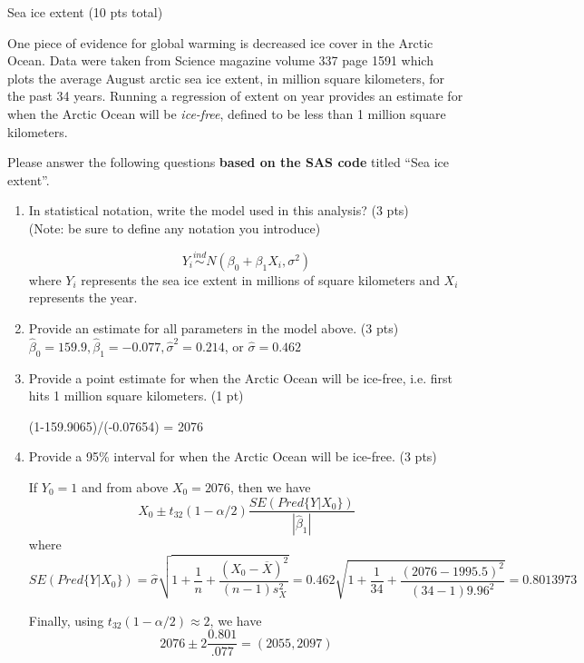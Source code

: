 \documentclass[10pt,draft]{article}
\newcommand{\bigbrk}{\vspace*{2in}}
\newcommand{\smallbrk}{\vspace*{.3in}}
\newcommand{\shortcorrect}[1]{{\color{red} #1}}
\newcommand{\longcorrect}[2][\bigbrk]{{\color{red} #2}}
\newcommand{\shortcorrect}[1]{{\phantom{33.33}}}
\newcommand{\longcorrect}[2][\bigbrk]{#1}
\begin{document}
\newpage
\noindent \begin{Large}Sea ice extent  (10 pts total) \end{Large}

\bigskip

One piece of evidence for global warming is decreased ice cover in the Arctic Ocean. Data were taken from Science magazine volume 337 page 1591 which plots the average August arctic sea ice extent, in million square kilometers, for the past 34 years. Running a regression of extent on year provides an estimate for when the Arctic Ocean will be \emph{ice-free}, defined to be less than 1 million square kilometers.

Please answer the following questions {\bf based on the SAS code} titled ``Sea ice extent''.

\begin{enumerate}
\item In statistical notation, write the model used in this analysis? (3 pts)\\
(Note: be sure to define any notation you introduce)

\longcorrect{\[Y_{i}\stackrel{ind}{\sim} N(\beta_0+\beta_1X_i,\sigma^2)\] where $Y_{i}$ represents the sea ice extent in millions of square kilometers and $X_i$ represents the year.} 

\item Provide an estimate for all parameters in the model above. (3 pts) \\

\longcorrect[\vspace*{.8in}]{$\hat{\beta}_0 = 159.9, \hat{\beta}_1 = -0.077, \hat{\sigma}^2 = 0.214$, or $\hat{\sigma} = 0.462$}

\item Provide a point estimate for when the Arctic Ocean will be ice-free, i.e. first hits 1 million square kilometers. (1 pt)

\shortcorrect{(1-159.9065)/(-0.07654) = 2076}\smallbrk

\item Provide a 95\% interval for when the Arctic Ocean will be ice-free. (3 pts)

\longcorrect{If $Y_0=1$ and from above $X_0=2076$, then we have 
\[ X_0 \pm t_{32}(1-\alpha/2) \frac{SE(Pred\{Y|X_0\})}{|\hat{\beta}_1|} \]
where 
\[ SE(Pred\{Y|X_0\}) = \hat{\sigma} \sqrt{1+\frac{1}{n}+\frac{(X_0-\overline{X})^2}{(n-1)s_X^2}} = 0.462 \sqrt{1+\frac{1}{34}+\frac{(2076-1995.5)^2}{(34-1)9.96^2}}=0.8013973\] 

Finally, using $t_{32}(1-\alpha/2)\approx 2$, we have
\[ 2076 \pm 2 \frac{0.801}{.077} = (2055,2097) \]
}

\end{enumerate}
\end{document}
